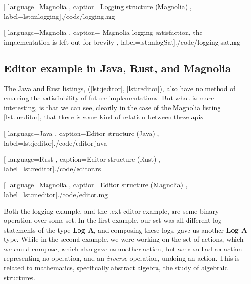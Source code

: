 \begin{center}
  
    [ language=Magnolia
    , caption={Logging structure (Magnolia)}
    , label=lst:mlogging]{./code/logging.mg}
\end{center}

\begin{center}
  
    [ language=Magnolia
    , caption={
        Magnolia logging satisfaction, the implementation is left out for
        brevity
      }
    , label=lst:mlogSat]{./code/logging-sat.mg}
\end{center}

\subsection{Editor example in Java, Rust, and Magnolia}

The Java and Rust listings, (\ref{lst:jeditor}, \ref{lst:reditor}), also have no
method of ensuring the satisfiability of future implementations. But what is
more interesting, is that we can see, clearily in the case of the Magnolia
listing \ref{lst:meditor}, that there is some kind of relation between these
\gls*{api}s.

\begin{code}[H]
  
    [ language=Java
    , caption={Editor structure (Java)}
    , label=lst:jeditor]{./code/editor.java}
\end{code}

\begin{code}[H]
  
    [ language=Rust
    , caption={Editor structure (Rust)}
    , label=lst:reditor]{./code/editor.rs}
\end{code}

\begin{code}[H]
  
    [ language=Magnolia
    , caption={Editor structure (Magnolia)}
    , label=lst:meditor]{./code/editor.mg}
\end{code}

Both the logging example, and the text editor example, are some binary operation
over some set. In the first example, our set was all different log statements of
the type \textbf{Log A}, and composing these logs, gave us another
\textbf{Log A} type. While in the second example, we were working on the set of
actions, which we could compose, which also gave us another action, but we also
had an action representing no-operation, and an \textit{inverse} operation,
undoing an action. This is related to mathematics, specifically abstract
algebra, the study of algebraic structures.

